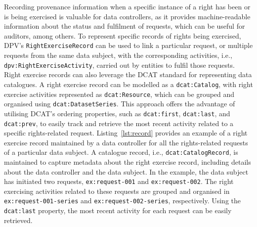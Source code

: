 \documentclass{IOS-Book-Article}     %
\begin{document}
Recording provenance information when a specific instance of a right has been or is being exercised is valuable for data controllers, as it provides machine-readable information about the status and fulfilment of requests, which can be useful for auditors, among others.
To represent specific records of rights being exercised, DPV's \texttt{RightExerciseRecord} can be used to link a particular request, or multiple requests from the same data subject, with the corresponding activities, i.e., \texttt{dpv:RightExerciseActivity}, carried out by entities to fulfil those requests.
Right exercise records can also leverage the DCAT standard for representing data catalogues.
A right exercise record can be modelled as a \texttt{dcat:Catalog}, with right exercise activities represented as \texttt{dcat:Resource}, which can be grouped and organised using \texttt{dcat:DatasetSeries}.
This approach offers the advantage of utilising DCAT's ordering properties, such as \texttt{dcat:first}, \texttt{dcat:last}, and \texttt{dcat:prev}, to easily track and retrieve the most recent activity related to a specific rights-related request.
Listing~\ref{lst:record} provides an example of a right exercise record maintained by a data controller for all the rights-related requests of a particular data subject.
A catalogue record, i.e., \texttt{dcat:CatalogRecord}, is maintained to capture metadata about the right exercise record, including details about the data controller and the data subject.
In the example, the data subject has initiated two requests, \texttt{ex:request-001} and \texttt{ex:request-002}.
The right exercising activities related to these requests are grouped and organised in \texttt{ex:request-001-series} and \texttt{ex:request-002-series}, respectively.
Using the \texttt{dcat:last} property, the most recent activity for each request can be easily retrieved.
\end{document}
